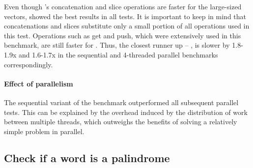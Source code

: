 Even though \rrbvec{}'s concatenation and slice operations are faster for the large-sized vectors, \stdvec{} showed the best results in all tests. It is important to keep in mind that concatenations and slices substitute only a small portion of all operations used in this test. Operations such as get and push, which were extensively used in this benchmark, are still faster for \stdvec{}. Thus, the closest runner up -- \pvec{}, is slower by 1.8-1.9x and 1.6-1.7x in the sequential and 4-threaded parallel benchmarks correspondingly. 

\paragraph{Effect of parallelism}
The sequential variant of the benchmark outperformed all subsequent parallel tests. This can be explained by the overhead induced by the distribution of work between multiple threads, which outweighs the benefits of solving a relatively simple problem in parallel.

\subsection{Check if a word is a palindrome}

